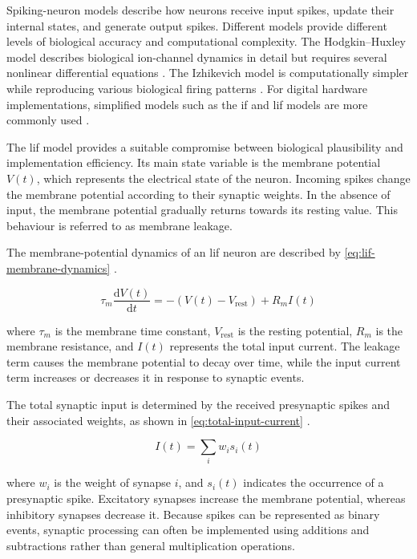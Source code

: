 Spiking-neuron models describe how neurons receive input spikes, update their internal states, and generate output spikes. Different models provide different levels of biological accuracy and computational complexity. The Hodgkin--Huxley model describes biological ion-channel dynamics in detail but requires several nonlinear differential equations \cite{HodgkinHuxley1952}. The Izhikevich model is computationally simpler while reproducing various biological firing patterns \cite{Izhikevich2003}. For digital hardware implementations, simplified models such as the \gls{if} and \gls{lif} models are more commonly used \cite{Gerstner2014}.

The \gls{lif} model provides a suitable compromise between biological plausibility and implementation efficiency. Its main state variable is the membrane potential \(V(t)\), which represents the electrical state of the neuron. Incoming spikes change the membrane potential according to their synaptic weights. In the absence of input, the membrane potential gradually returns towards its resting value. This behaviour is referred to as membrane leakage.

The membrane-potential dynamics of an \gls{lif} neuron are described by \cref{eq:lif-membrane-dynamics} \cite{Gerstner2014}.

\begin{equation}
    \tau_m \frac{\mathrm{d}V(t)}{\mathrm{d}t}
    =
    -\left(V(t)-V_{\mathrm{rest}}\right)
    + R_m I(t)
    \label{eq:lif-membrane-dynamics}
\end{equation}

where \(\tau_m\) is the membrane time constant, \(V_{\mathrm{rest}}\) is the resting potential, \(R_m\) is the membrane resistance, and \(I(t)\) represents the total input current. The leakage term causes the membrane potential to decay over time, while the input current term increases or decreases it in response to synaptic events.

The total synaptic input is determined by the received presynaptic spikes and their associated weights, as shown in \cref{eq:total-input-current} \cite{Gerstner2014}.

\begin{equation}
    I(t)
    =
    \sum_{i} w_i s_i(t)
    \label{eq:total-input-current}
\end{equation}

where \(w_i\) is the weight of synapse \(i\), and \(s_i(t)\) indicates the occurrence of a presynaptic spike. Excitatory synapses increase the membrane potential, whereas inhibitory synapses decrease it. Because spikes can be represented as binary events, synaptic processing can often be implemented using additions and subtractions rather than general multiplication operations.

